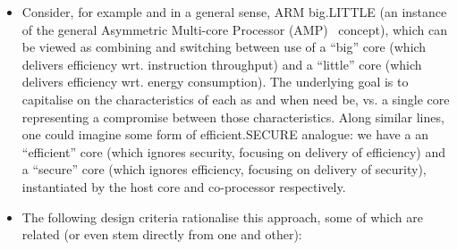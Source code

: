 \begin{itemize}
\item Consider, for example and in a general sense, ARM {\sf big.LITTLE}
      (an instance of the general Asymmetric Multi-core Processor (AMP)~\cite{SCARV:Mittal:16} concept),
      which can be viewed as combining and switching between
      use of
      a ``big''    core (which delivers efficiency wrt. instruction throughput)
      and 
      a ``little'' core (which delivers efficiency wrt. energy consumption).
      The underlying goal is to capitalise on the characteristics of each as 
      and when need be, vs. a single core representing a compromise between 
      those characteristics.  Along similar lines, one could imagine some
      form of {\sf efficient.SECURE} analogue: we have a 
      an ``efficient'' core (which ignores   security, focusing on delivery of efficiency)
      and
      a  ``secure''    core (which ignores efficiency, focusing on delivery of   security),
      instantiated by the host core and \XCID co-processor respectively.

\item The following design criteria rationalise this approach, some of which
      are related (or even stem directly from one and other):


\end{itemize}
